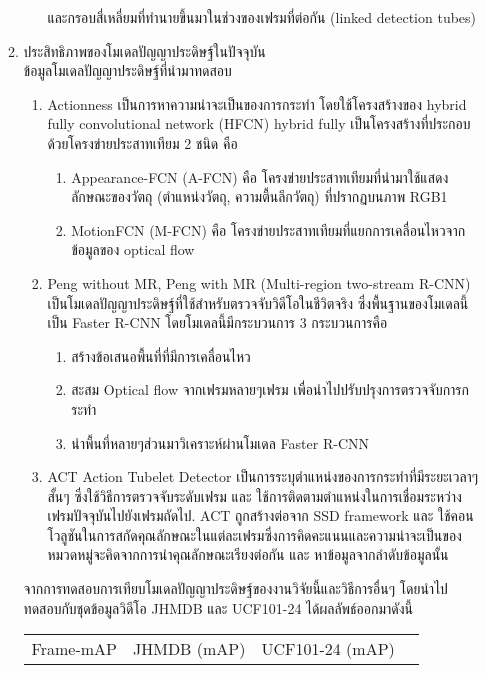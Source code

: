 \begin{enumerate}
\begin{enumerate}
\begin{enumerate}
			และกรอบสี่เหลี่ยมที่ทำนายขึ้นมาในช่วงของเฟรมที่ต่อกัน (linked detection tubes) 
		\end{enumerate}
		\item ประสิทธิภาพของโมเดลปัญญาประดิษฐ์ในปัจจุบัน
		\\ข้อมูลโมเดลปัญญาประดิษฐ์ที่นำมาทดสอบ
		\begin{enumerate}				
			\item Actionness\textsuperscript{\cite{actioness}} เป็นการหาความน่าจะเป็นของการกระทำ โดยใช้โครงสร้างของ hybrid fully convolutional network (HFCN) hybrid fully เป็นโครงสร้างที่ประกอบด้วยโครงข่ายประสาทเทียม 2 ชนิด คือ
			\begin{enumerate}
				\item Appearance-FCN (A-FCN) คือ โครงข่ายประสาทเทียมที่นำมาใช้แสดงลักษณะของวัตถุ (ตำแหน่งวัตถุ, ความตื้นลึกวัตถุ) ที่ปรากฏบนภาพ RGB1
				\item MotionFCN (M-FCN) คือ โครงข่ายประสาทเทียมที่แยกการเคลื่อนไหวจากข้อมูลของ optical flow
			 \end{enumerate}
			\item Peng without MR, Peng with MR (Multi-region two-stream R-CNN)\textsuperscript{\cite{peng}} เป็นโมเดลปัญญาประดิษฐ์ที่ใช้สำหรับตรวจจับวิดีโอในชีวิตจริง ซึ่งพื้นฐานของโมเดลนี้เป็น Faster R-CNN โดยโมเดลนี้มีกระบวนการ 3 กระบวนการคือ
			\begin{enumerate}
					\item สร้างข้อเสนอพื้นที่ที่มีการเคลื่อนไหว
					\item สะสม Optical flow จากเฟรมหลายๆเฟรม เพื่อนำไปปรับปรุงการตรวจจับการกระทำ
					\item นำพื้นที่หลายๆส่วนมาวิเคราะห์ผ่านโมเดล Faster R-CNN
			\end{enumerate}
			\item ACT Action Tubelet Detector\textsuperscript{\cite{act}} เป็นการระบุตำแหน่งของการกระทำที่มีระยะเวลาๆสั้นๆ ซึ่งใช้วิธีการตรวจจับระดับเฟรม และ ใช้การติดตามตำแหน่งในการเชื่อมระหว่างเฟรมปัจจุบันไปยังเฟรมถัดไป. ACT ถูกสร้างต่อจาก SSD framework และ ใช้คอนโวลูชันในการสกัดคุณลักษณะในแต่ละเฟรมซึ่งการคิดคะแนนและความน่าจะเป็นของหมวดหมู่จะคิดจากการนำคุณลักษณะเรียงต่อกัน และ หาข้อมูลจากลำดับข้อมูลนั้น
		\end{enumerate}
		จากการทดสอบการเทียบโมเดลปัญญาประดิษฐ์ของงานวิจัยนี้และวิธีการอื่นๆ โดยนำไปทดสอบกับชุดข้อมูลวิดีโอ JHMDB และ UCF101-24 ได้ผลลัพธ์ออกมาดังนี้
			\begin{table}[!ht]
				\centering
				\begin{tabular}{|c|c|c|c|}
					\hline
					{Frame-mAP}&{JHMDB (mAP)}&{UCF101-24 (mAP)}								\\

\end{tabular}
\end{table}
\end{enumerate}
\end{enumerate}
